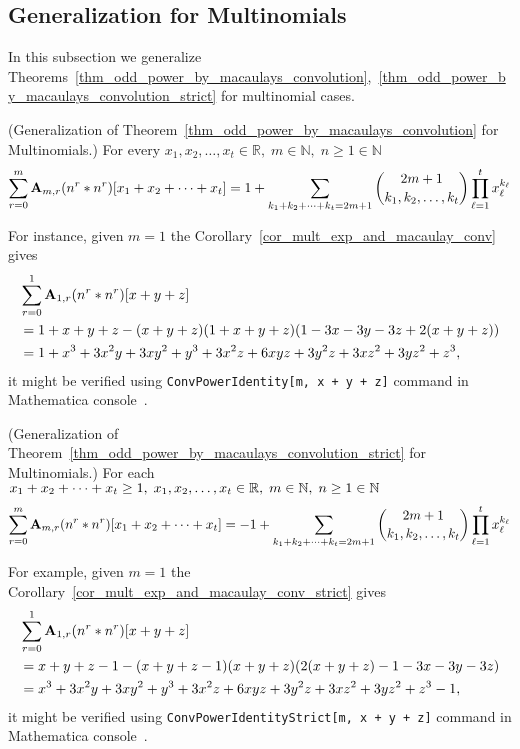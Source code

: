 \subsection{Generalization for Multinomials} \label{subsec:generalization-for-multinomials}
In this subsection we generalize
Theorems~\ref{thm_odd_power_by_macaulays_convolution},~\ref{thm_odd_power_by_macaulays_convolution_strict}
for multinomial cases.
\begin{cor}
    \label{cor_mult_exp_and_macaulay_conv}
    (Generalization of Theorem~\ref{thm_odd_power_by_macaulays_convolution} for Multinomials.)
    For every $x_1, x_2, \ldots, x_t\in\mathbb{R}, \; m\in\mathbb{N}, \; n\geq1\in\mathbb{N}$
    \[
        \sum_{r=0}^{m} \coeffA{m}{r} \convPower{n}{r}{\multifoldSum{t}} =
        1 + \sum_{\multifoldSum[k]{t}=2m+1} \binom{2m+1}{k_1, k_2,\ldots, k_t} \prod_{\ell=1}^{t} x_\ell^{k_\ell}
    \]
\end{cor}
For instance, given $m=1$ the Corollary~\ref{cor_mult_exp_and_macaulay_conv} gives
\begin{equation*}
    \begin{split}
        &\sum_{r=0}^{1} \coeffA{1}{r} \convPower{n}{r}{x+y+z} \\
        &=1 + x + y + z - (x + y + z) (1 + x + y + z) (1 - 3 x - 3 y - 3 z + 2 (x + y + z)) \\
        &=1 + x^3 + 3 x^2 y + 3 x y^2 + y^3 + 3 x^2 z + 6 x y z + 3 y^2 z + 3 x z^2 + 3 y z^2 + z^3,
    \end{split}
\end{equation*}
it might be verified using  \texttt{ConvPowerIdentity[m, x + y + z]}
command in Mathematica console~\cite{mmca_package}.
\begin{cor}
    \label{cor_mult_exp_and_macaulay_conv_strict}
    (Generalization of Theorem~\ref{thm_odd_power_by_macaulays_convolution_strict} for Multinomials.)
    For each $\multifoldSum{t} \geq 1, \; x_1,x_2,\ldots,x_t\in\mathbb{R}, \; m\in\mathbb{N}, \; n\geq1\in\mathbb{N}$
    \[
        \sum_{r=0}^{m} \coeffA{m}{r} \convPower{n}{r}{\multifoldSum{t}} =
        -1 + \sum_{\multifoldSum[k]{t}=2m+1} \binom{2m+1}{k_1, k_2,\ldots, k_t} \prod_{\ell=1}^{t} x_\ell^{k_\ell}
    \]
\end{cor}
For example, given $m=1$ the Corollary~\ref{cor_mult_exp_and_macaulay_conv_strict} gives
\begin{equation*}
    \begin{split}
        &\sum_{r=0}^{1} \coeffA{1}{r} \convPower{n}{r}{x+y+z} \\
        &=x + y + z -1 - (x + y + z -1) (x + y + z) (2 (x + y + z) - 1 - 3 x - 3 y - 3 z) \\
        &=x^3 + 3 x^2 y + 3 x y^2 + y^3 + 3 x^2 z + 6 x y z + 3 y^2 z + 3 x z^2 + 3 y z^2 + z^3-1,
    \end{split}
\end{equation*}
it might be verified using \texttt{ConvPowerIdentityStrict[m, x + y + z]}
command in Mathematica console~\cite{mmca_package}.